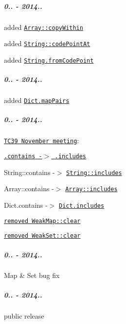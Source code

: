 \subparagraph*{0.. -\/ 2014..}


\begin{DoxyItemize}
\item added \href{https://github.com/zloirock/core-js/#ecmascript-6-array}{\tt {\ttfamily Array\+::copy\+Within}}
\item added \href{https://github.com/zloirock/core-js/#ecmascript-6-string}{\tt {\ttfamily String\+::code\+Point\+At}}
\item added \href{https://github.com/zloirock/core-js/#ecmascript-6-string}{\tt {\ttfamily String.\+from\+Code\+Point}}
\end{DoxyItemize}

\subparagraph*{0.. -\/ 2014..}


\begin{DoxyItemize}
\item added \href{https://github.com/zloirock/core-js/#dict}{\tt {\ttfamily Dict.\+map\+Pairs}}
\end{DoxyItemize}

\subparagraph*{0.. -\/ 2014..}


\begin{DoxyItemize}
\item \href{https://github.com/rwaldron/tc39-notes/tree/master/es6/2014-11}{\tt T\+C39 November meeting}\+:
\begin{DoxyItemize}
\item \href{https://github.com/rwaldron/tc39-notes/blob/master/es6/2014-11/nov-18.md#51--44-arrayprototypecontains-and-stringprototypecontains}{\tt {\ttfamily .contains} -\/$>$ {\ttfamily .includes}}
\begin{DoxyItemize}
\item {\ttfamily String\+::contains} -\/$>$ \href{https://github.com/zloirock/core-js/#ecmascript-6-string}{\tt {\ttfamily String\+::includes}}
\item {\ttfamily Array\+::contains} -\/$>$ \href{https://github.com/zloirock/core-js/#ecmascript-7}{\tt {\ttfamily Array\+::includes}}
\item {\ttfamily Dict.\+contains} -\/$>$ \href{https://github.com/zloirock/core-js/#dict}{\tt {\ttfamily Dict.\+includes}}
\end{DoxyItemize}
\item \href{https://github.com/rwaldron/tc39-notes/blob/master/es6/2014-11/nov-19.md#412-should-weakmapweakset-have-a-clear-method-markm}{\tt removed {\ttfamily Weak\+Map\+::clear}}
\item \href{https://github.com/rwaldron/tc39-notes/blob/master/es6/2014-11/nov-19.md#412-should-weakmapweakset-have-a-clear-method-markm}{\tt removed {\ttfamily Weak\+Set\+::clear}}
\end{DoxyItemize}
\end{DoxyItemize}

\subparagraph*{0.. -\/ 2014..}


\begin{DoxyItemize}
\item {\ttfamily Map} \& {\ttfamily Set} bug fix
\end{DoxyItemize}

\subparagraph*{0.. -\/ 2014..}


\begin{DoxyItemize}
\item public release 
\end{DoxyItemize}
